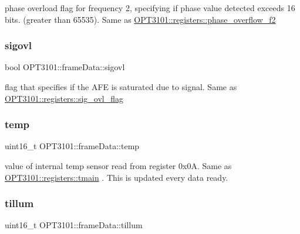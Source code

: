 phase overload flag for frequency 2, specifying if phase value detected exceeds 16 bits. (greater than 65535). Same as \mbox{\hyperlink{class_o_p_t3101_1_1registers_a63560e719cf9970bc83879a353b2dc9f}{O\+P\+T3101\+::registers\+::phase\+\_\+overflow\+\_\+f2}} 

\mbox{\label{class_o_p_t3101_1_1frame_data_a5fde4a7c755e99367d2fc79feb51cf1b}} 
\subsubsection{\texorpdfstring{sigovl}{sigovl}}
{\footnotesize\ttfamily bool O\+P\+T3101\+::frame\+Data\+::sigovl}



flag that specifies if the A\+FE is saturated due to signal. Same as \mbox{\hyperlink{class_o_p_t3101_1_1registers_ad767a496a0cad5741d575a54a095add3}{O\+P\+T3101\+::registers\+::sig\+\_\+ovl\+\_\+flag}} 

\mbox{\label{class_o_p_t3101_1_1frame_data_a537975687785cc0fb002dc70384af7ab}} 
\subsubsection{\texorpdfstring{temp}{temp}}
{\footnotesize\ttfamily uint16\+\_\+t O\+P\+T3101\+::frame\+Data\+::temp}



value of internal temp sensor read from register 0x0A. Same as \mbox{\hyperlink{class_o_p_t3101_1_1registers_a3dfd8d81d4cb04d274007deb7c6122fc}{O\+P\+T3101\+::registers\+::tmain}} . This is updated every data ready. 

\mbox{\label{class_o_p_t3101_1_1frame_data_aeb1934ab0ac8d1f846cf166ef26ceb75}} 
\subsubsection{\texorpdfstring{tillum}{tillum}}
{\footnotesize\ttfamily uint16\+\_\+t O\+P\+T3101\+::frame\+Data\+::tillum}



